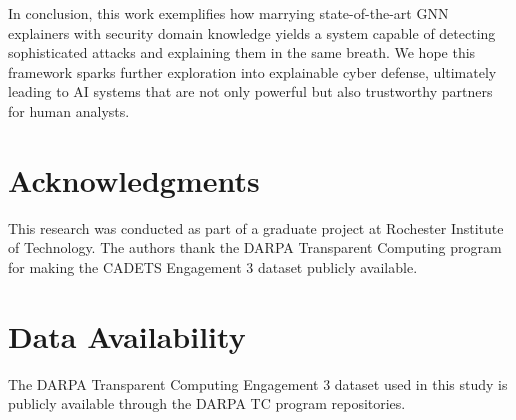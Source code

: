 \documentclass[conference]{IEEEtran}
\begin{document}
In conclusion, this work exemplifies how marrying state-of-the-art GNN explainers with security domain knowledge yields a system capable of detecting sophisticated attacks and explaining them in the same breath. We hope this framework sparks further exploration into explainable cyber defense, ultimately leading to AI systems that are not only powerful but also trustworthy partners for human analysts.

\section*{Acknowledgments}
This research was conducted as part of a graduate project at Rochester Institute of Technology. The authors thank the DARPA Transparent Computing program for making the CADETS Engagement 3 dataset publicly available.

\section*{Data Availability}
The DARPA Transparent Computing Engagement 3 dataset used in this study is publicly available through the DARPA TC program repositories.
\end{document}
